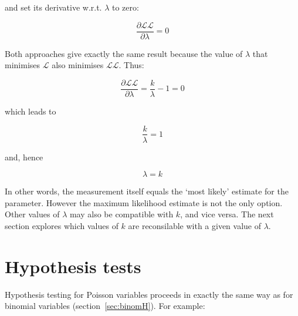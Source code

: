 \noindent and set its derivative w.r.t. $\lambda$ to zero:

\begin{equation}
  \frac{\partial{\mathcal{LL}}}{\partial{\lambda}} = 0
\end{equation}

Both approaches give exactly the same result because the value of
$\lambda$ that minimises $\mathcal{L}$ also minimises $\mathcal{LL}$.
Thus:

\begin{equation}
  \frac{\partial{\mathcal{LL}}}{\partial{\lambda}} = \frac{k}{\lambda} - 1 = 0
\end{equation}

\noindent which leads to

\begin{equation}
  \frac{k}{\lambda} = 1
\end{equation}

\noindent and, hence

\begin{equation}
  \lambda = k
  \label{eq:lambda=k}
\end{equation}

In other words, the measurement itself equals the `most likely'
estimate for the parameter. However the maximum likelihood estimate is
not the only option. Other values of $\lambda$ may also be compatible
with $k$, and vice versa. The next section explores which values of
$k$ are reconsilable with a given value of $\lambda$.

\section{Hypothesis tests}
\label{sec:poishyp}

Hypothesis testing for Poisson variables proceeds in exactly the same
way as for binomial variables (section~\ref{sec:binomH}). For example:

